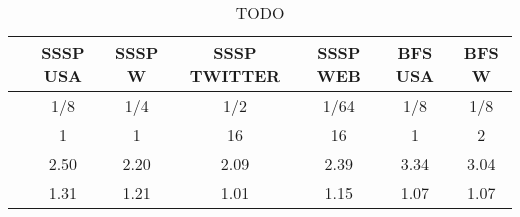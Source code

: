 \begin{table}[h]
\centring
\begin{tabular}{ |c|c|c|c|c|c|c| }
\hline
 & \large{\textbf{SSSP USA}} & \large{\textbf{SSSP W}} & \large{\textbf{SSSP TWITTER}} & \large{\textbf{SSSP WEB}} & \large{\textbf{BFS USA}} & \large{\textbf{BFS W}} \\
\hline
\insprob{} & 1/8 & 1/4 & 1/2 & 1/64 & 1/8 & 1/8 \\
\hline
\delbatch{} & 1 & 1 & 16 & 16 & 1 & 2 \\
\hline
\speed{} & 2.50 & 2.20 & 2.09 & 2.39 & 3.34 & 3.04 \\
\hline
\workinc{} & 1.31 & 1.21 & 1.01 & 1.15 & 1.07 & 1.07 \\
\hline
\end{tabular}
\vspace{0.3em}
\caption{TODO }
\label{table:todo}
\end{table}

